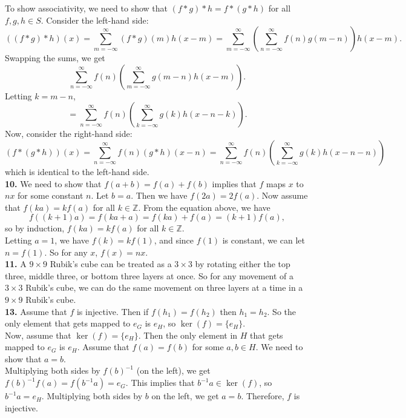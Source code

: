 \documentclass{article}
\newcommand{\Z}{\mathbb{Z}}
\begin{document}
To show associativity, we need to show that $(f * g) * h = f * (g * h)$ for all $f, g, h \in S$. Consider the left-hand side:
$$((f * g) * h)(x) = \sum_{m = -\infty}^\infty (f * g)(m)h(x - m) = \sum_{m = -\infty}^\infty \left(\sum_{n = -\infty}^\infty f(n)g(m - n)\right)h(x - m).$$
Swapping the sums, we get
$$\sum_{n = -\infty}^\infty f(n)\left(\sum_{m = -\infty}^\infty g(m - n)h(x - m)\right).$$
Letting $k = m - n$,
$$= \sum_{n = -\infty}^\infty f(n)\left(\sum_{k = -\infty}^\infty g(k)h(x - n - k)\right).$$
Now, consider the right-hand side:
$$(f * (g * h))(x) = \sum_{n = -\infty}^\infty f(n)(g * h)(x - n) = \sum_{n = -\infty}^\infty f(n)\left(\sum_{k = -\infty}^\infty g(k)h(x - n - n)\right)$$
which is identical to the left-hand side. \\

\textbf{10.} We need to show that $f(a + b) = f(a) + f(b)$ implies that $f$ maps $x$ to $nx$ for some constant $n$. Let $b = a$. Then we have $f(2a) = 2f(a)$. Now assume that $f(ka) = kf(a)$ for all $k \in \Z$. From the equation above, we have
$$f((k + 1)a) = f(ka + a) = f(ka) + f(a) = (k + 1)f(a),$$
so by induction, $f(ka) = kf(a)$ for all $k \in \Z$. \\

Letting $a = 1$, we have $f(k) = kf(1)$, and since $f(1)$ is constant, we can let $n = f(1)$. So for any $x$, $f(x) = nx$. \\

\textbf{11.} A $9\times 9$ Rubik's cube can be treated as a $3\times 3$ by rotating either the top three, middle three, or bottom three layers at once. So for any movement of a $3\times 3$ Rubik's cube, we can do the same movement on three layers at a time in a $9\times 9$ Rubik's cube. \\

\textbf{13.} Assume that $f$ is injective. Then if $f(h_1) = f(h_2)$ then $h_1 = h_2$. So the only element that gets mapped to $e_G$ is $e_H$, so $\ker(f) = \{e_H\}$. \\

Now, assume that $\ker(f) = \{e_H\}$. Then the only element in $H$ that gets mapped to $e_G$ is $e_H$. Assume that $f(a) = f(b)$ for some $a, b \in H$. We need to show that $a = b$. \\

Multiplying both sides by $f(b)^{-1}$ (on the left), we get $f(b)^{-1}f(a) = f(b^{-1}a) = e_G$. This implies that $b^{-1}a \in \ker(f)$, so $b^{-1}a = e_H$. Multiplying both sides by $b$ on the left, we get $a = b$. Therefore, $f$ is injective.
\end{document}
